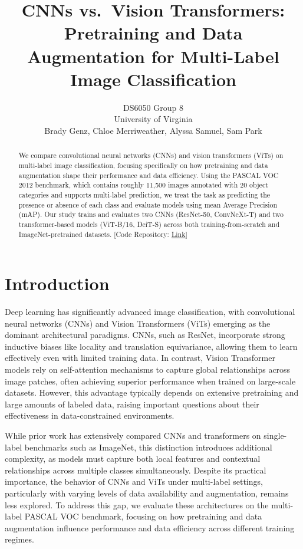 \documentclass{article}
\title{CNNs vs.\ Vision Transformers: Pretraining and Data Augmentation for Multi-Label Image Classification}
\author{%
  DS6050 Group 8 \\
  University of Virginia \\
  Brady Genz, Chloe Merriweather, Alyssa Samuel, Sam Park \\
}
\begin{document}
\maketitle

\begin{abstract}
We compare convolutional neural networks (CNNs) and vision transformers (ViTs) on multi-label image classification, focusing specifically on how pretraining and data augmentation shape their performance and data efficiency. Using the PASCAL VOC 2012 benchmark, which contains roughly 11,500 images annotated with 20 object categories and supports multi-label prediction, we treat the task as predicting the presence or absence of each class and evaluate models using mean Average Precision (mAP). Our study trains and evaluates two CNNs (ResNet-50, ConvNeXt-T) and two transformer-based models (ViT-B/16, DeiT-S) across both training-from-scratch and ImageNet-pretrained datasets. [Code Repository: \href{https://github.com/sanghoonio/image-cnn-transformers}{Link}]
\end{abstract}


\section{Introduction}

Deep learning has significantly advanced image classification, with convolutional neural networks (CNNs) and Vision Transformers (ViTs) emerging as the dominant architectural paradigms. CNNs, such as ResNet, incorporate strong inductive biases like locality and translation equivariance, allowing them to learn effectively even with limited training data. In contrast, Vision Transformer models rely on self-attention mechanisms to capture global relationships across image patches, often achieving superior performance when trained on large-scale datasets. However, this advantage typically depends on extensive pretraining and large amounts of labeled data, raising important questions about their effectiveness in data-constrained environments.

While prior work has extensively compared CNNs and transformers on single-label benchmarks such as ImageNet, this distinction introduces additional complexity, as models must capture both local features and contextual relationships across multiple classes simultaneously. Despite its practical importance, the behavior of CNNs and ViTs under multi-label settings, particularly with varying levels of data availability and augmentation, remains less explored. To address this gap, we evaluate these architectures on the multi-label PASCAL VOC benchmark, focusing on how pretraining and data augmentation influence performance and data efficiency across different training regimes.
\end{document}
